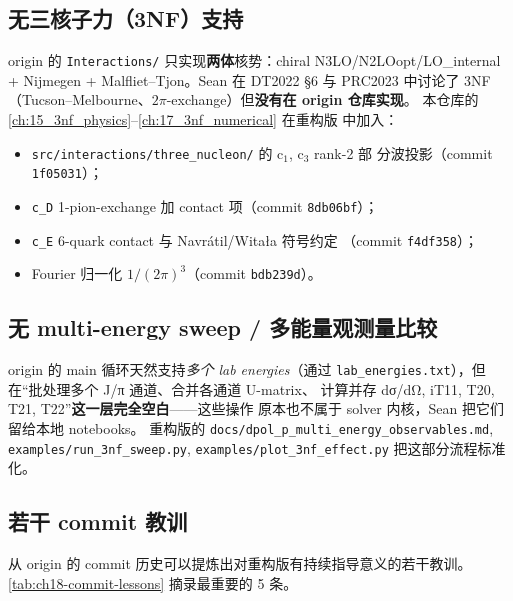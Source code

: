 \subsection{无三核子力（3NF）支持}

origin 的 \texttt{Interactions/} 只实现\textbf{两体}核势：chiral N3LO/N2LOopt/LO\_internal
+ Nijmegen + Malfliet--Tjon。Sean 在 DT2022 §6 与 PRC2023 中讨论了 3NF
（Tucson--Melbourne、$2\pi$-exchange）但\textbf{没有在 origin 仓库实现}。
本仓库的 \cref{ch:15_3nf_physics}--\cref{ch:17_3nf_numerical} 在重构版
中加入：
\begin{itemize}
\item \texttt{src/interactions/three\_nucleon/} 的 c$_1$, c$_3$ rank-2 部
      分波投影（commit \texttt{1f05031}）；
\item \texttt{c\_D} 1-pion-exchange 加 contact 项（commit \texttt{8db06bf}）；
\item \texttt{c\_E} 6-quark contact 与 Navrátil/Witała 符号约定
      （commit \texttt{f4df358}）；
\item Fourier 归一化 $1/(2\pi)^3$（commit \texttt{bdb239d}）。
\end{itemize}

\subsection{无 multi-energy sweep / 多能量观测量比较}

origin 的 main 循环天然支持\emph{多个 lab energies}（通过
\texttt{lab\_energies.txt}），但在“批处理多个 J/π 通道、合并各通道 U-matrix、
计算并存 dσ/dΩ, iT11, T20, T21, T22”\textbf{这一层完全空白}——这些操作
原本也不属于 solver 内核，Sean 把它们留给本地 notebooks。
重构版的
\texttt{docs/dpol\_p\_multi\_energy\_observables.md},
\texttt{examples/run\_3nf\_sweep.py},
\texttt{examples/plot\_3nf\_effect.py} 把这部分流程标准化。

\subsection{若干 commit 教训}

从 origin 的 commit 历史可以提炼出对重构版有持续指导意义的若干教训。
\cref{tab:ch18-commit-lessons} 摘录最重要的 5 条。

